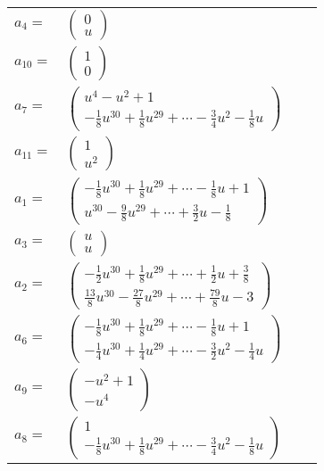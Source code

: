 \documentclass[1p]{elsarticle_modified}
\theoremstyle{definition}
\begin{document}
\begin{tabular}{m{7pt} m{180pt} m{7pt} m{180pt} }
\flushright $a_{4}=$&$\begin{pmatrix}0\\u\end{pmatrix}$ \\
\flushright $a_{10}=$&$\begin{pmatrix}1\\0\end{pmatrix}$ \\
\flushright $a_{7}=$&$\begin{pmatrix}u^4- u^2+1\\-\frac{1}{8} u^{30}+\frac{1}{8} u^{29}+\cdots-\frac{3}{4} u^2-\frac{1}{8} u\end{pmatrix}$ \\
\flushright $a_{11}=$&$\begin{pmatrix}1\\u^2\end{pmatrix}$ \\
\flushright $a_{1}=$&$\begin{pmatrix}-\frac{1}{8} u^{30}+\frac{1}{8} u^{29}+\cdots-\frac{1}{8} u+1\\u^{30}-\frac{9}{8} u^{29}+\cdots+\frac{3}{2} u-\frac{1}{8}\end{pmatrix}$ \\
\flushright $a_{3}=$&$\begin{pmatrix}u\\u\end{pmatrix}$ \\
\flushright $a_{2}=$&$\begin{pmatrix}-\frac{1}{2} u^{30}+\frac{1}{8} u^{29}+\cdots+\frac{1}{2} u+\frac{3}{8}\\\frac{13}{8} u^{30}-\frac{27}{8} u^{29}+\cdots+\frac{79}{8} u-3\end{pmatrix}$ \\
\flushright $a_{6}=$&$\begin{pmatrix}-\frac{1}{8} u^{30}+\frac{1}{8} u^{29}+\cdots-\frac{1}{8} u+1\\-\frac{1}{4} u^{30}+\frac{1}{4} u^{29}+\cdots-\frac{3}{2} u^2-\frac{1}{4} u\end{pmatrix}$ \\
\flushright $a_{9}=$&$\begin{pmatrix}- u^2+1\\- u^4\end{pmatrix}$ \\
\flushright $a_{8}=$&$\begin{pmatrix}1\\-\frac{1}{8} u^{30}+\frac{1}{8} u^{29}+\cdots-\frac{3}{4} u^2-\frac{1}{8} u\end{pmatrix}$ \\

\end{tabular}
\end{document}
